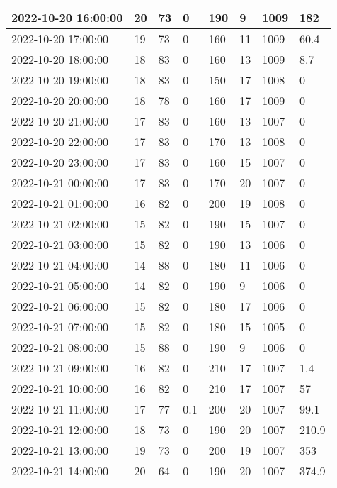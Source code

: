 \begin{longtable}{|l|l|l|l|l|l|l|l|}
        2022-10-20 16:00:00 & 20 & 73 & 0 & 190 & 9 & 1009 & 182 \\ \hline
        2022-10-20 17:00:00 & 19 & 73 & 0 & 160 & 11 & 1009 & 60.4 \\ \hline
        2022-10-20 18:00:00 & 18 & 83 & 0 & 160 & 13 & 1009 & 8.7 \\ \hline
        2022-10-20 19:00:00 & 18 & 83 & 0 & 150 & 17 & 1008 & 0 \\ \hline
        2022-10-20 20:00:00 & 18 & 78 & 0 & 160 & 17 & 1009 & 0 \\ \hline
        2022-10-20 21:00:00 & 17 & 83 & 0 & 160 & 13 & 1007 & 0 \\ \hline
        2022-10-20 22:00:00 & 17 & 83 & 0 & 170 & 13 & 1008 & 0 \\ \hline
        2022-10-20 23:00:00 & 17 & 83 & 0 & 160 & 15 & 1007 & 0 \\ \hline
        2022-10-21 00:00:00 & 17 & 83 & 0 & 170 & 20 & 1007 & 0 \\ \hline
        2022-10-21 01:00:00 & 16 & 82 & 0 & 200 & 19 & 1008 & 0 \\ \hline
        2022-10-21 02:00:00 & 15 & 82 & 0 & 190 & 15 & 1007 & 0 \\ \hline
        2022-10-21 03:00:00 & 15 & 82 & 0 & 190 & 13 & 1006 & 0 \\ \hline
        2022-10-21 04:00:00 & 14 & 88 & 0 & 180 & 11 & 1006 & 0 \\ \hline
        2022-10-21 05:00:00 & 14 & 82 & 0 & 190 & 9 & 1006 & 0 \\ \hline
        2022-10-21 06:00:00 & 15 & 82 & 0 & 180 & 17 & 1006 & 0 \\ \hline
        2022-10-21 07:00:00 & 15 & 82 & 0 & 180 & 15 & 1005 & 0 \\ \hline
        2022-10-21 08:00:00 & 15 & 88 & 0 & 190 & 9 & 1006 & 0 \\ \hline
        2022-10-21 09:00:00 & 16 & 82 & 0 & 210 & 17 & 1007 & 1.4 \\ \hline
        2022-10-21 10:00:00 & 16 & 82 & 0 & 210 & 17 & 1007 & 57 \\ \hline
        2022-10-21 11:00:00 & 17 & 77 & 0.1 & 200 & 20 & 1007 & 99.1 \\ \hline
        2022-10-21 12:00:00 & 18 & 73 & 0 & 190 & 20 & 1007 & 210.9 \\ \hline
        2022-10-21 13:00:00 & 19 & 73 & 0 & 200 & 19 & 1007 & 353 \\ \hline
        2022-10-21 14:00:00 & 20 & 64 & 0 & 190 & 20 & 1007 & 374.9 \\ \hline

\end{longtable}
